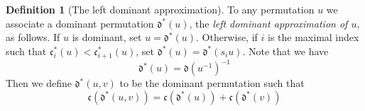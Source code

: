 \documentclass{amsart}
\newtheorem{lemma}{Lemma}[subsection]
\theoremstyle{definition}
\newtheorem{definition}[lemma]{Definition}
\theoremstyle{remark}
\numberwithin{equation}{subsection}
\newcommand{\desc}{\mathrm{Desc}}%
\newcommand{\dom}{\mathfrak{d}}
\newcommand{\ldom}{\dom^*}
\newcommand{\code}{\mathfrak{c}}
\begin{document}
%


\begin{definition}[The left dominant approximation] \label{definition:leftdom}
To any permutation $u$ we associate a dominant permutation $\ldom(u)$, the \emph{left dominant approximation of $u$}, as follows. If $u$ is dominant, set $u=\ldom(u)$. Otherwise, if $i$ is the maximal index such that $\code_i^*(u)<\code_{i+1}^*(u)$, set $\ldom(u)=\ldom(s_iu)$. Note that we have
$$\ldom(u)=\dom(u^{-1})^{-1}$$
Then we define $\ldom(u,v)$ to be the dominant permutation such that
$$\code(\ldom(u,v))=\code(\ldom(u))+\code(\ldom(v))$$
\end{definition}
\end{document}
